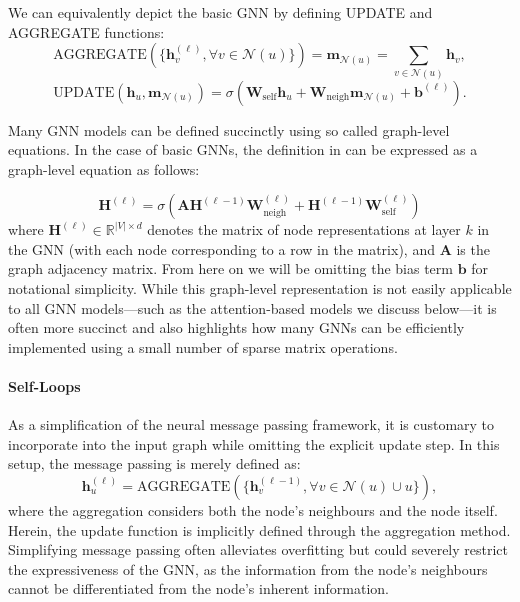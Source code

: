 We can equivalently depict the basic GNN by defining UPDATE and AGGREGATE functions:
\begin{equation}\label{eq:aggregateBase}
    \text{AGGREGATE}(\{\mathbf{h}_v^{(\ell)}, \forall v \in \mathcal{N}(u)\}) =
    \mathbf{m}_{\mathcal{N}(u)} = \sum_{v\in\mathcal{N}(u)}\mathbf{h}_v,
\end{equation}
\begin{equation}\label{eq:updateBase}
    \text{UPDATE}(\mathbf{h}_u, \mathbf{m}_{\mathcal{N}(u)}) = \sigma(\mathbf{W}_\text{self}\mathbf{h}_u + \mathbf{W}_\text{neigh}\mathbf{m}_{\mathcal{N}(u)} + \mathbf{b}^{(\ell)}).
\end{equation}

Many GNN models can be defined succinctly using so called graph-level equations. In the case of basic GNNs, the definition in  can be expressed as a graph-level equation as follows:

\begin{equation}\label{eq:basicGNNgraphlevel}
    \mathbf{H}^{(\ell)} = \sigma\left(\mathbf{A}\mathbf{H}^{(\ell-1)}\mathbf{W}_\text{neigh}^{(\ell)} + \mathbf{H}^{(\ell-1)}\mathbf{W}_\text{self}^{(\ell)}\right)
\end{equation}
where $\mathbf{H}^{(\ell)} \in \mathbb{R}^{|V| \times d}$ denotes the matrix of node representations at layer $k$ in the GNN (with each node corresponding to a row in the matrix), and $\mathbf{A}$ is the graph adjacency matrix. From here on we will be omitting the bias term $\mathbf{b}$ for notational simplicity. While this graph-level representation is not easily applicable to all GNN models—such as the attention-based models we discuss below—it is often more succinct and also highlights how many GNNs can be efficiently implemented using a small number of sparse matrix operations.


\paragraph{Self-Loops}
As a simplification of the neural message passing framework, it is customary to incorporate  into the input graph while omitting the explicit update step. In this setup, the message passing is merely defined as:
\begin{equation}\label{eq:selfLoop}
    \mathbf{h}_u^{(\ell)} = \text{AGGREGATE}(\{\mathbf{h}_v^{(\ell-1)}, \forall v \in \mathcal{N}(u)\cup {u}\}),
\end{equation}
where the aggregation considers both the node's neighbours and the node itself. Herein, the update function is implicitly defined through the aggregation method. Simplifying message passing often alleviates overfitting but could severely restrict the expressiveness of the GNN, as the information from the node's neighbours cannot be differentiated from the node's inherent information.

